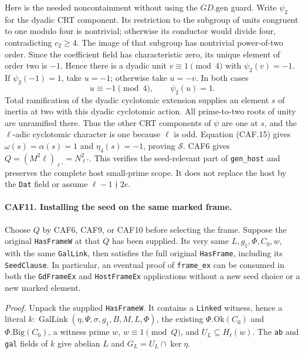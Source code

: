 Here is the needed noncontainment without using the
\(GD.\mathrm{gen}\) guard.  Write \(\psi_2\) for the dyadic
CRT component.  Its restriction to the subgroup of units congruent
to one modulo four is nontrivial; otherwise its conductor would
divide four, contradicting \(c_2\ge4\).  The image of that subgroup
has nontrivial power-of-two order.  Since the coefficient field has
characteristic zero, its unique element of order two is \(-1\).
Hence there is a dyadic unit \(v\equiv1\pmod4\) with
\(\psi_2(v)=-1\).  If \(\psi_2(-1)=1\), take \(u=-1\);
otherwise take \(u=-v\).  In both cases
\[
                  u\equiv-1\pmod4,\qquad \psi_2(u)=1.
 \tag{CAF.15}
\]
Total ramification of the dyadic cyclotomic extension supplies an
element \(s\) of inertia at two with this dyadic cyclotomic action.
All prime-to-two roots of unity are unramified there.  Thus the other
CRT components of \(\psi\) are one at \(s\), and the
\(\ell\)-adic cyclotomic character is one because \(\ell\) is odd.
Equation (CAF.15) gives
\(\omega(s)=\alpha(s)=1\) and \(\eta_4(s)=-1\), proving
\(\mathcal S\).  CAF6 gives
\(Q=(M^2\ell)_{\ell'}=N_{\ell'}^2\).
This verifies the seed-relevant part of \texttt{gen\_host} and
preserves the complete host small-prime scope.  It does not replace
the host by the \texttt{Dat} field or assume
\(\ell-1\nmid2e\).

\paragraph{CAF11. Installing the seed on the same marked frame.}
\label{claim:CAF11}
Choose \(Q\) by CAF6, CAF9, or CAF10 before selecting the frame.
Suppose the original \texttt{HasFrameW} at that \(Q\) has been
supplied.  Its very same
\(L,g_1,\Phi,C_0,w\), with the same \texttt{GalLink}, then
satisfies the full original \texttt{HasFrame}, including its
\texttt{SeedClause}.  In particular, an eventual proof of
\texttt{frame\_ex} can be consumed in both the \texttt{GdFrameEx}
and \texttt{HostFrameEx} applications without a new seed choice or
a new marked element.

\emph{Proof.}
Unpack the supplied \texttt{HasFrameW}.  It contains a
\texttt{Linked} witness, hence a literal
\(k:\operatorname{GalLink}(\eta,\Psi,\sigma,g_1,B,M,L,\Phi)\),
the existing \(\Phi.\mathrm{Ok}(C_0)\) and
\(\Phi.\mathrm{Big}(C_0)\), a witness prime \(w\),
\(w\equiv1\pmod Q\), and \(U_L\subseteq H_\ell(w)\).
The \texttt{ab} and \texttt{gal} fields of \(k\) give abelian
\(L\) and \(G_L=U_L\cap\ker\eta\).

